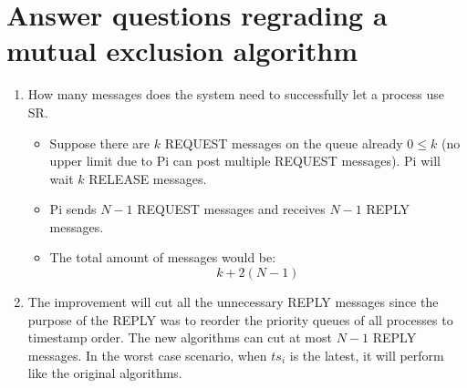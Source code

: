 \documentclass[11pt,a4paper]{report}
\begin{document}
\section{Answer questions regrading a mutual exclusion algorithm}
\begin{enumerate}[label=\alph*)]
	\item How many messages does the system need to successfully let a process use SR. 
	\begin{itemize}
		\item Suppose there are $k$ REQUEST messages on the queue already $0 \leq k$ (no upper limit due to Pi can post multiple REQUEST messages). Pi will wait $k$ RELEASE messages.
		\item Pi sends $N-1$ REQUEST messages and receives $N-1$ REPLY messages.
		\item The total amount of messages would be:
		\[k + 2(N-1)\]
	\end{itemize}
	\item The improvement will cut all the unnecessary REPLY messages since the purpose of the REPLY was to reorder the priority queues of all processes to timestamp order. The new algorithms can cut at most $N - 1$ REPLY messages. In the worst case scenario, when $ts_i$ is the latest, it will perform like the original algorithms.
\end{enumerate}
\end{document}
